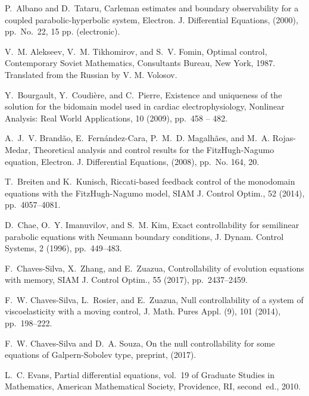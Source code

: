 \documentclass[10pt]{article}
\begin{document}
\begin{thebibliography}{10}

{ P.~Albano and D.~Tataru}, { Carleman estimates and boundary
  observability for a coupled parabolic-hyperbolic system}, Electron. J.
  Differential Equations,  (2000), pp.~No.\ 22, 15 pp. (electronic).

{V.~M. Alekseev, V.~M. Tikhomirov, and S.~V. Fomin}, { Optimal control},
  Contemporary Soviet Mathematics, Consultants Bureau, New York, 1987.
\newblock Translated from the Russian by V. M. Volosov.

{ Y.~Bourgault, Y.~Coudi{\`e}re, and C.~Pierre}, { Existence and
  uniqueness of the solution for the bidomain model used in cardiac
  electrophysiology}, Nonlinear Analysis: Real World Applications, 10 (2009),
  pp.~458 -- 482.

{A.~J.~V. Brand{\~a}o, E.~Fern{\'a}ndez-Cara, P.~M.~D. Magalh{\~a}es, and
  M.~A. Rojas-Medar}, { Theoretical analysis and control results for the
  {F}itz{H}ugh-{N}agumo equation}, Electron. J. Differential Equations,
  (2008), pp.~No. 164, 20.

{ T.~Breiten and K.~Kunisch}, { Riccati-based feedback control of the
  monodomain equations with the {F}itz{H}ugh-{N}agumo model}, SIAM J. Control
  Optim., 52 (2014), pp.~4057--4081.

{ D.~Chae, O.~Y. Imanuvilov, and S.~M. Kim}, { Exact controllability for
  semilinear parabolic equations with {N}eumann boundary conditions}, J. Dynam.
  Control Systems, 2 (1996), pp.~449--483.

{ F.~Chaves-Silva, X.~Zhang, and E.~Zuazua}, { Controllability of
  evolution equations with memory}, SIAM J. Control Optim., 55 (2017),
  pp.~2437--2459.

{ F.~W. Chaves-Silva, L.~Rosier, and E.~Zuazua}, { Null controllability
  of a system of viscoelasticity with a moving control}, J. Math. Pures Appl.
  (9), 101 (2014), pp.~198--222.

{F.~W. Chaves-Silva and D.~A. Souza}, { On the null controllability for
  some equations of {G}alpern-{S}obolev type}, preprint,  (2017).

{ L.~C. Evans}, { Partial differential equations}, vol.~19 of Graduate
  Studies in Mathematics, American Mathematical Society, Providence, RI,
  second~ed., 2010.


\end{thebibliography}
\end{document}
